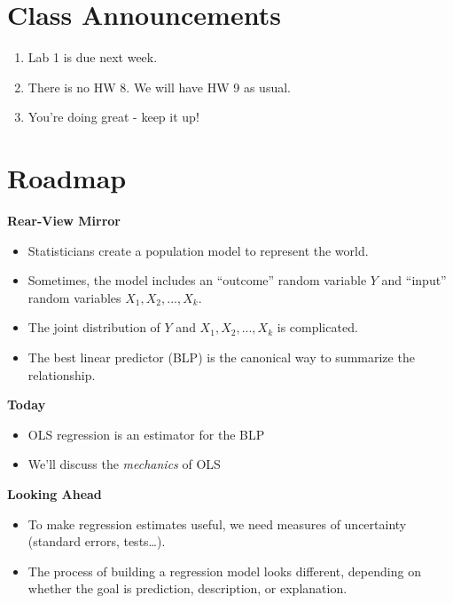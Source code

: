 \documentclass[
]{book}
\providecommand{\tightlist}{%
  \setlength{\itemsep}{0pt}\setlength{\parskip}{0pt}}
\theoremstyle{definition}
\theoremstyle{definition}
\theoremstyle{definition}
\theoremstyle{definition}
\theoremstyle{remark}
\begin{document}
\section{Class Announcements}\label{class-announcements-6}

\begin{enumerate}
\def\labelenumi{\arabic{enumi}.}
\tightlist
\item
  Lab 1 is due next week.
\item
  There is no HW 8. We will have HW 9 as usual.
\item
  You're doing great - keep it up!
\end{enumerate}

\section{Roadmap}\label{roadmap-4}

\textbf{Rear-View Mirror}

\begin{itemize}
\tightlist
\item
  Statisticians create a population model to represent the world.
\item
  Sometimes, the model includes an ``outcome'' random variable \(Y\) and ``input'' random variables \(X_1, X_2,...,X_k\).
\item
  The joint distribution of \(Y\) and \(X_1, X_2,...,X_k\) is complicated.
\item
  The best linear predictor (BLP) is the canonical way to summarize the relationship.
\end{itemize}

\textbf{Today}

\begin{itemize}
\tightlist
\item
  OLS regression is an estimator for the BLP
\item
  We'll discuss the \emph{mechanics} of OLS
\end{itemize}

\textbf{Looking Ahead}

\begin{itemize}
\tightlist
\item
  To make regression estimates useful, we need measures of uncertainty (standard errors, tests\ldots).
\item
  The process of building a regression model looks different, depending on whether the goal is prediction, description, or explanation.
\end{itemize}
\end{document}
